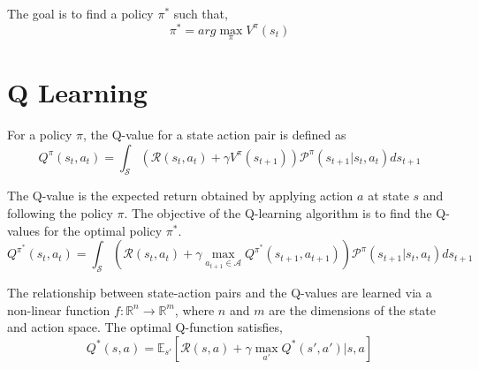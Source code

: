 \documentclass{article}
\begin{document}
The goal is to find a policy $\pi^*$ such that,
\begin{equation}
	\pi^* = arg\max_{\pi} V^{\pi}(s_t)
\end{equation}

\section{Q Learning}
For a policy $\pi$, the Q-value for a state action pair is defined as 
\begin{equation}
	Q^{\pi}(s_t,a_t) = \int_{\mathcal{S}} \left( \mathcal{R} (s_t,a_t) + \gamma V^{\pi}(s_{t+1}) \right) \mathcal{P}^{\pi}(s_{t+1}|s_t,a_t)ds_{t+1}
\end{equation}

The Q-value is the expected return obtained by applying action $a$ at state $s$ and following the policy $\pi$. The objective of the Q-learning algorithm is to find the Q-values for the optimal policy $\pi^*$.
\begin{equation}
	Q^{\pi^*}(s_t,a_t) = \int_{\mathcal{S}} \left(\mathcal{R}(s_t,a_t) + \gamma \max_{a_{t+1} \in \mathcal{A}} Q^{\pi^*}(s_{t+1},a_{t+1}) \right) \mathcal{P}^{\pi}(s_{t+1}|s_t,a_t)ds_{t+1}
\end{equation}

The relationship between state-action pairs and the Q-values are learned via a non-linear function $f: \mathbb{R}^n \to \mathbb{R}^m$, where $n$ and $m$ are the dimensions of the state and action space. The optimal Q-function satisfies,
\begin{equation}
	Q^*(s,a) = \mathbb{E}_{s'} \left[ \mathcal{R}(s,a) + \gamma \max_{a'} Q^*(s',a')|s,a \right]
\end{equation} 
\end{document}
